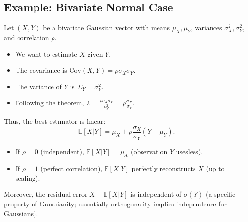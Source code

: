 \subsection{Example: Bivariate Normal Case}
Let $(X, Y)$ be a bivariate Gaussian vector with means $\mu_X, \mu_Y$, variances $\sigma_X^2, \sigma_Y^2$, and correlation $\rho$.
\begin{itemize}
    \item We want to estimate $X$ given $Y$.
    \item The covariance is $\text{Cov}(X, Y) = \rho \sigma_X \sigma_Y$.
    \item The variance of $Y$ is $\Sigma_Y = \sigma_Y^2$.
    \item Following the theorem, $\lambda = \frac{\rho \sigma_X \sigma_Y}{\sigma_Y^2} = \rho \frac{\sigma_X}{\sigma_Y}$.
\end{itemize}
Thus, the best estimator is linear:
\[
\mathbb{E}[X|Y] = \mu_X + \rho \frac{\sigma_X}{\sigma_Y} (Y - \mu_Y).
\]
\begin{itemize}
    \item If $\rho=0$ (independent), $\mathbb{E}[X|Y] = \mu_X$ (observation $Y$ usesless).
    \item If $\rho=1$ (perfect correlation), $\mathbb{E}[X|Y]$ perfectly reconstructs $X$ (up to scaling).
\end{itemize}
Moreover, the residual error $X - \mathbb{E}[X|Y]$ is independent of $\sigma(Y)$ (a specific property of Gaussianity; essentially orthogonality implies independence for Gaussians).
